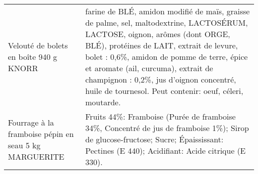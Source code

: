 \begin{longtable}{p{5cm}p{10cm}}
                                                                   Velouté de bolets en boîte 940 g KNORR &                                                                                                                                                                                                                                                                                                                                                                                                                                                                                                                                                                                                                                                                      farine de BLÉ, amidon modifié de maïs, graisse de palme, sel, maltodextrine, LACTOSÉRUM, LACTOSE, oignon, arômes (dont ORGE, BLÉ), protéines de LAIT, extrait de levure, bolet : 0,6\%, amidon de pomme de terre, épice et aromate (ail, curcuma), extrait de champignon : 0,2\%, jus d'oignon concentré, huile de tournesol.  Peut contenir: oeuf, céleri, moutarde. \\
                                                    Fourrage à la framboise pépin en seau 5 kg MARGUERITE &                                                                                                                                                                                                                                                                                                                                                                                                                                                                                                                                                                                                                                                                                                                                                                                                                                                  Fruits 44\%: Framboise (Purée de framboise 34\%, Concentré de jus de framboise 1\%); Sirop de glucose-fructose; Sucre; Épaississant: Pectines (E 440); Acidifiant: Acide citrique (E 330). \\

\end{longtable}
